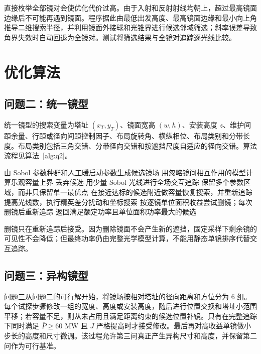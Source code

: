 \documentclass[UTF8,a4paper,11pt]{ctexart}
\begin{document}
直接枚举全部镜对会使优化代价过高。由于入射和反射射线均朝上，超过最高镜面边缘后不可能再遇到镜面。程序据此由最低出发高度、最高镜面边缘和最小向上角推导二维搜索半径，并利用镜面外接球和光锥界进行候选邻域筛选；斜率误差导致角界失效时自动回退为全镜对。测试将筛选结果与全镜对追踪逐光线比较。

\section{优化算法}
\subsection{问题二：统一镜型}
统一镜型的搜索变量为塔址 $(x_T,y_T)$、镜面宽高 $(w,h)$、安装高度 $z$、维护间距余量、行距或径向间距控制因子、布局旋转角、横纵相位、布局类别和分带长度。布局类别包括三角交错、分带径向交错和按遮挡尺度自适应的径向交错。算法流程见算法~\ref{alg:q2}。

\begin{algorithm}[H]
\caption{问题二的多保真优化流程}\label{alg:q2}
\begin{algorithmic}[1]
\State 由 Sobol 参数种群和人工暖启动参数生成候选镜场
  \State 用忽略镜间相互作用的模型计算乐观容量上界
    \State 丢弃候选
  \EndIf
  \State 用少量 Sobol 光线进行全场交互追踪
\EndFor
\State 保留多个参数区域，而非只保留单一最优点
  \State 在接近达标的候选附近做容量恢复搜索，并重新追踪
\EndIf
{}
  \State 提高光线数，执行精英差分扰动和坐标搜索
  \State 按逐镜单位面积收益尝试删镜；每次删镜后重新追踪
\EndFor
\State 返回满足额定功率且单位面积功率最大的候选
\end{algorithmic}
\end{algorithm}

删镜只在重新追踪后接受。因为删除镜面不会产生新的遮挡，固定采样下剩余镜的可见性不会降低；但最终功率仍由完整光学模型计算，不能用静态单镜排序代替交互追踪。

\subsection{问题三：异构镜型}
问题三从问题二的可行解开始，将镜场按相对塔址的径向距离和方位分为 6 组。每个试探步骤修改一组的宽度、高度或安装高度，随后进行位置交换和塔址小范围平移；若容量不足，则从未占用且满足距离约束的候选位置补镜。只有在完整追踪下同时满足 $\overline P\ge60$ MW 且 $J$ 严格提高时才接受修改。最后再对高收益单镜做小步长的高度和尺寸微调。该过程允许第三问真正产生异构尺寸和高度，并保留第二问作为可行基准。
\end{document}

